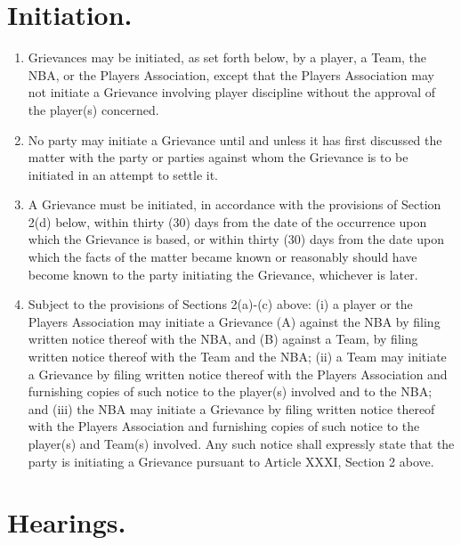 \documentclass[
]{book}
\providecommand{\tightlist}{%
  \setlength{\itemsep}{0pt}\setlength{\parskip}{0pt}}
\begin{document}
\hypertarget{initiation.}{%
\section{Initiation.}\label{initiation.}}

\begin{enumerate}
\def\labelenumi{(\alph{enumi})}
\tightlist
\item
  Grievances may be initiated, as set forth below, by a player, a Team, the NBA, or the Players Association, except that the Players Association may not initiate a Grievance involving player discipline without the approval of the player(s) concerned.
\item
  No party may initiate a Grievance until and unless it has first discussed the matter with the party or parties against whom the Grievance is to be initiated in an attempt to settle it.
\item
  A Grievance must be initiated, in accordance with the provisions of Section 2(d) below, within thirty (30) days from the date of the occurrence upon which the Grievance is based, or within thirty (30) days from the date upon which the facts of the matter became known or reasonably should have become known to the party initiating the Grievance, whichever is later.
\item
  Subject to the provisions of Sections 2(a)-(c) above: (i) a player or the Players Association may initiate a Grievance (A) against the NBA by filing written notice thereof with the NBA, and (B) against a Team, by filing written notice thereof with the Team and the NBA; (ii) a Team may initiate a Grievance by filing written notice thereof with the Players Association and furnishing copies of such notice to the player(s) involved and to the NBA; and (iii) the NBA may initiate a Grievance by filing written notice thereof with the Players Association and furnishing copies of such notice to the player(s) and Team(s) involved. Any such notice shall expressly state that the party is initiating a Grievance pursuant to Article XXXI, Section 2 above.
\end{enumerate}

\hypertarget{hearings.}{%
\section{Hearings.}\label{hearings.}}
\end{document}
